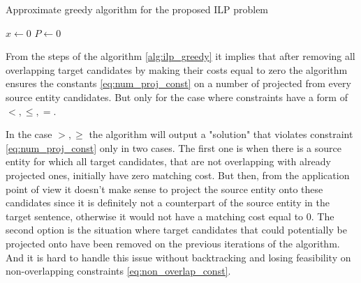 \begin{algorithm}
  \caption{Approximate greedy algorithm for the proposed ILP problem} \label{alg:ilp_greedy}

  \( x \gets 0 \) \;
  \( P \gets 0 \) 
\end{algorithm}

From the steps of the algorithm \ref{alg:ilp_greedy} it implies that after removing all
overlapping target candidates by making their costs equal to zero the algorithm ensures the
constants \eqref{eq:num_proj_const} on a number of projected from every source entity candidates.
But only for the case where constraints have a form of \( <, \leq, = \).

In the case \( >, \geq \) the algorithm will output a "solution" that violates constraint
\eqref{eq:num_proj_const} only in two cases. The first one is when there is a source entity for which
all target candidates, that are not overlapping with already projected ones, initially have zero matching cost. But then,
from the application point of view it doesn't make sense to project the source entity onto these candidates
since it is definitely not a counterpart of the source entity in the target sentence, otherwise it would not
have a matching cost equal to \( 0 \). The second option is the situation where target candidates
that could potentially be projected onto have been removed on the previous iterations of the algorithm.
And it is hard to handle this issue without backtracking and losing feasibility on
non-overlapping constraints \eqref{eq:non_overlap_const}.

